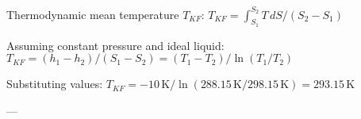 Thermodynamic mean temperature \( T_{KF} \):  
\( T_{KF} = \int_{S_1}^{S_2} T \, dS / (S_2 - S_1) \)  

Assuming constant pressure and ideal liquid:  
\( T_{KF} = (h_1 - h_2) / (S_1 - S_2) = (T_1 - T_2) / \ln(T_1 / T_2) \)  

Substituting values:  
\( T_{KF} = -10 \, \text{K} / \ln(288.15 \, \text{K} / 298.15 \, \text{K}) = 293.15 \, \text{K} \)  

---